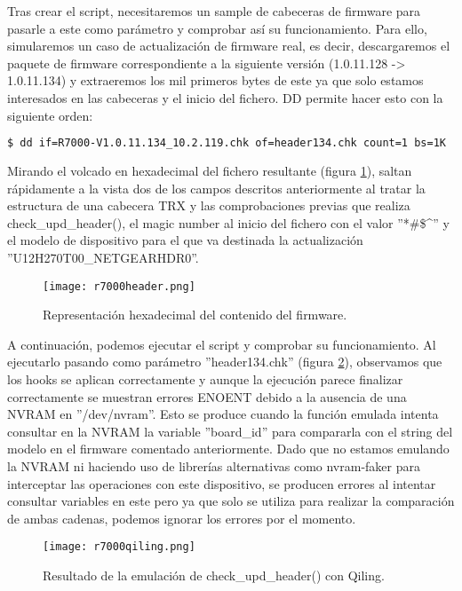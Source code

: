 Tras crear el script, necesitaremos un sample de cabeceras de firmware para pasarle a este como parámetro y comprobar así
su funcionamiento. Para ello, simularemos un caso de actualización de firmware real, es decir, descargaremos el paquete de 
firmware correspondiente a la siguiente versión (1.0.11.128 -> 1.0.11.134) y extraeremos los mil primeros bytes de este ya que 
solo estamos interesados en las cabeceras y el inicio del fichero. DD permite hacer esto con la siguiente orden:

\begin{lstlisting}[language=bash, breaklines]
    $ dd if=R7000-V1.0.11.134_10.2.119.chk of=header134.chk count=1 bs=1K
\end{lstlisting}

Mirando el volcado en hexadecimal del fichero resultante (figura \ref{fig:R7000header}), saltan rápidamente a la vista dos de
los campos descritos anteriormente al tratar la estructura de una cabecera TRX y las comprobaciones previas que realiza 
check\_upd\_header(), el magic number al inicio del fichero con el valor ''*\#\$\textasciicircum'' y el modelo de dispositivo
para el que va destinada la actualización ''U12H270T00\_NETGEARHDR0''.

\begin{figure}[H]
    \centering
    \texttt{[image: r7000header.png]}
    \caption{Representación hexadecimal del contenido del firmware.}
    \label{fig:R7000header}
\end{figure}

A continuación, podemos ejecutar el script y comprobar su funcionamiento. Al ejecutarlo pasando como parámetro 
''header134.chk'' (figura \ref{fig:R7000qiling}), observamos que los hooks se aplican correctamente y aunque la ejecución 
parece finalizar correctamente se muestran errores ENOENT debido a la ausencia de una NVRAM en ''/dev/nvram''. Esto se produce cuando la función emulada
intenta consultar en la NVRAM la variable ''board\_id'' para compararla con el string del modelo en el firmware comentado
anteriormente. Dado que no estamos emulando la NVRAM ni haciendo uso de librerías alternativas como nvram-faker\cite{nvram}
para interceptar las operaciones con este dispositivo, se producen errores al intentar consultar variables en este pero ya
que solo se utiliza para realizar la comparación de ambas cadenas, podemos ignorar los errores por el momento.

\begin{figure}[H]
    \centering
    \texttt{[image: r7000qiling.png]}
    \caption{Resultado de la emulación de check\_upd\_header() con Qiling.}
    \label{fig:R7000qiling}
\end{figure}

